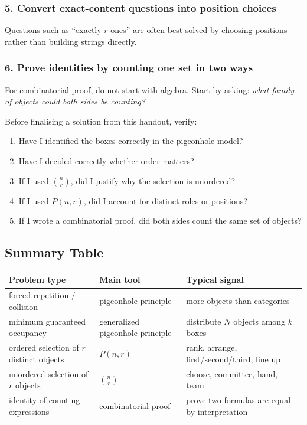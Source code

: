 \subsubsection*{5. Convert exact-content questions into position choices}
Questions such as ``exactly $r$ ones'' are often best solved by choosing positions rather than building strings directly.

\subsubsection*{6. Prove identities by counting one set in two ways}
For combinatorial proof, do not start with algebra. Start by asking: \emph{what family of objects could both sides be counting?}

\begin{examtip}[title={High-yield diagnostic checklist}]
Before finalising a solution from this handout, verify:
\begin{enumerate}[leftmargin=*]
    \item Have I identified the boxes correctly in the pigeonhole model?
    \item Have I decided correctly whether order matters?
    \item If I used $\binom{n}{r}$, did I justify why the selection is unordered?
    \item If I used $P(n,r)$, did I account for distinct roles or positions?
    \item If I wrote a combinatorial proof, did both sides count the same set of objects?
\end{enumerate}
\end{examtip}

\subsection{Summary Table}

\begin{center}
\small
\begin{tabular}{@{}p{}p{}p{}@{}}
\toprule
\textbf{Problem type} & \textbf{Main tool} & \textbf{Typical signal} \\
\midrule
forced repetition / collision & pigeonhole principle & more objects than categories \\
minimum guaranteed occupancy & generalized pigeonhole principle & distribute $N$ objects among $k$ boxes \\
ordered selection of $r$ distinct objects & $P(n,r)$ & rank, arrange, first/second/third, line up \\
unordered selection of $r$ objects & $\binom{n}{r}$ & choose, committee, hand, team \\
identity of counting expressions & combinatorial proof & prove two formulas are equal by interpretation \\
\bottomrule
\end{tabular}
\end{center}

